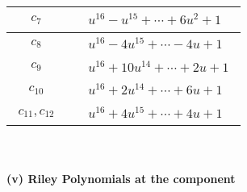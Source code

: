 \documentclass[1p]{elsarticle_modified}
\theoremstyle{definition}
\begin{document}
\begin{tabular}{m{50pt}|m{274pt}}
\hline $$\begin{aligned}c_{7}\end{aligned}$$&$\begin{aligned}
&u^{16}- u^{15}+\cdots+6 u^2+1
\end{aligned}$\\
\hline $$\begin{aligned}c_{8}\end{aligned}$$&$\begin{aligned}
&u^{16}-4 u^{15}+\cdots-4 u+1
\end{aligned}$\\
\hline $$\begin{aligned}c_{9}\end{aligned}$$&$\begin{aligned}
&u^{16}+10 u^{14}+\cdots+2 u+1
\end{aligned}$\\
\hline $$\begin{aligned}c_{10}\end{aligned}$$&$\begin{aligned}
&u^{16}+2 u^{14}+\cdots+6 u+1
\end{aligned}$\\
\hline $$\begin{aligned}c_{11},c_{12}\end{aligned}$$&$\begin{aligned}
&u^{16}+4 u^{15}+\cdots+4 u+1
\end{aligned}$\\
\hline
\end{tabular}\\~\\
\newpage\renewcommand{\arraystretch}{1}
\flushleft \textbf{(v) Riley Polynomials at the component}\newline \\
\end{document}
